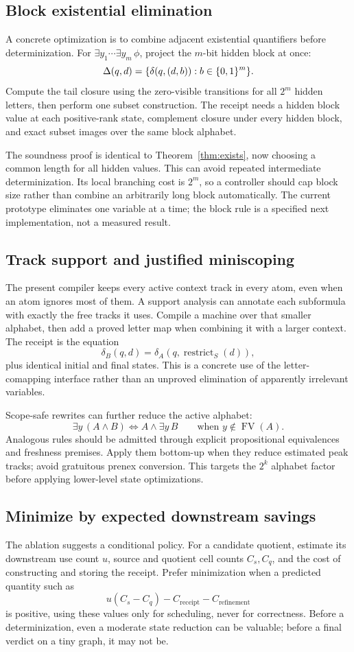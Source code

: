 \subsection{Block existential elimination}
A concrete optimization is to combine adjacent existential quantifiers before determinization. For
\(\exists y_1\cdots\exists y_m\,\phi\), project the \(m\)-bit hidden block at once:
\[
 \Delta(q,d)=\{\delta(q,(d,b)):b\in\{0,1\}^m\}.
\]
Compute the tail closure using the zero-visible transitions for all \(2^m\) hidden letters, then perform one subset construction. The receipt needs a hidden block value at each positive-rank state, complement closure under every hidden block, and exact subset images over the same block alphabet.

The soundness proof is identical to Theorem~\ref{thm:exists}, now choosing a common length for all hidden values. This can avoid repeated intermediate determinization. Its local branching cost is \(2^m\), so a controller should cap block size rather than combine an arbitrarily long block automatically. The current prototype eliminates one variable at a time; the block rule is a specified next implementation, not a measured result.

\subsection{Track support and justified miniscoping}
The present compiler keeps every active context track in every atom, even when an atom ignores most of them. A support analysis can annotate each subformula with exactly the free tracks it uses. Compile a machine over that smaller alphabet, then add a proved letter map when combining it with a larger context. The receipt is the equation
\[
 \delta_B(q,d)=\delta_A(q,\operatorname{restrict}_S(d)),
\]
plus identical initial and final states. This is a concrete use of the letter-comapping interface rather than an unproved elimination of apparently irrelevant variables.

Scope-safe rewrites can further reduce the active alphabet:
\[
 \exists y\,(A\land B)\iff A\land\exists y\,B
 \qquad\text{when }y\notin\operatorname{FV}(A).
\]
Analogous rules should be admitted through explicit propositional equivalences and freshness premises. Apply them bottom-up when they reduce estimated peak tracks; avoid gratuitous prenex conversion. This targets the \(2^k\) alphabet factor before applying lower-level state optimizations.

\subsection{Minimize by expected downstream savings}
The ablation suggests a conditional policy. For a candidate quotient, estimate its downstream use count \(u\), source and quotient cell counts \(C_s,C_q\), and the cost of constructing and storing the receipt. Prefer minimization when a predicted quantity such as
\[
 u(C_s-C_q)-C_{\mathrm{receipt}}-C_{\mathrm{refinement}}
\]
is positive, using these values only for scheduling, never for correctness. Before a determinization, even a moderate state reduction can be valuable; before a final verdict on a tiny graph, it may not be.

